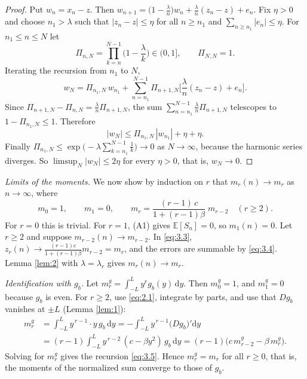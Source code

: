 \documentclass[aip,jmp,preprint,onecolumn,floatfix,superscriptaddress,nofootinbib,11pt]{revtex4-2}
\theoremstyle{plain}
\theoremstyle{remark}
\numberwithin{equation}{section}
\newcommand{\dd}{\mathrm{d}}
\newcommand{\E}{\mathbb{E}}
\begin{document}
\begin{proof} Put $w_n=x_n-z$. Then $w_{n+1}=\big(1-\tfrac\lambda n\big)w_n+\tfrac\lambda n(z_n-z)+e_n$. Fix $\eta>0$ and choose $n_1>\lambda$ such that $|z_n-z|\le\eta$ for all $n\ge n_1$ and $\sum_{n\ge n_1}|e_n|\le\eta$. For $n_1\le n\le N$ let
%
\begin{equation*}
\Pi_{n,N}=\prod_{k=n}^{N-1}\Big(1-\frac\lambda k\Big)\in(0,1],\qquad \Pi_{N,N}=1 .
\end{equation*}
%
Iterating the recursion from $n_1$ to $N$,
%
\begin{equation*}
w_N=\Pi_{n_1,N}\,w_{n_1}+\sum_{n=n_1}^{N-1}\Pi_{n+1,N}\Big[\frac\lambda n(z_n-z)+e_n\Big].
\end{equation*}
%
Since $\Pi_{n+1,N}-\Pi_{n,N}=\tfrac\lambda n \Pi_{n+1,N}$, the sum $\sum_{n=n_1}^{N-1}\tfrac\lambda n\Pi_{n+1,N}$ telescopes to $1-\Pi_{n_1,N}\le1$. Therefore
%
\begin{equation*}
|w_N|\le \Pi_{n_1,N}\,|w_{n_1}|+\eta+\eta .
\end{equation*}
%
Finally $\Pi_{n_1,N}\le\exp\big(-\lambda\sum_{k=n_1}^{N-1}\tfrac1k\big)\to0$ as $N\to\infty$, because the harmonic series diverges. So $\limsup_N|w_N|\le2\eta$ for every $\eta>0$, that is, $w_N\to0$. 
\end{proof}
 
\textit{Limits of the moments.} We now show by induction on $r$ that $m_r(n)\to m_r$ as $n\to\infty$, where
%
\begin{equation}
m_0=1,\qquad m_1=0,\qquad m_r=\frac{(r-1)\,c}{1+(r-1)\beta}\;m_{r-2}\quad(r\ge2).
\label{eq:3.5}
\end{equation}
%
For $r=0$ this is trivial. For $r=1$, (A1) gives $\E[S_n]=0$, so $m_1(n)=0$. Let $r\ge2$ and suppose $m_{r-2}(n)\to m_{r-2}$. In \eqref{eq:3.3}, $z_r(n)\to\tfrac{(r-1)c}{1+(r-1)\beta}m_{r-2}=m_r$, and the errors are summable by \eqref{eq:3.4}. Lemma \ref{lem:2} with $\lambda=\lambda_r$ gives $m_r(n)\to m_r$.
 
\textit{Identification with $g_b$.} Let $m_r^{g}=\int_{-L}^{L}y^{r}g_b(y)\,\dd y$. Then $m_0^{g}=1$, and $m_1^{g}=0$ because $g_b$ is even. For $r\ge2$, use \eqref{eq:2.1}, integrate by parts, and use that $Dg_b$ vanishes at $\pm L$ (Lemma \ref{lem:1}):
%
\begin{equation*}
\begin{aligned} m_r^{g}&=\int_{-L}^{L}y^{\,r-1}\cdot y\,g_b\,\dd y=-\int_{-L}^{L}y^{\,r-1}\big(Dg_b\big)'\dd y\\[4pt] &=(r-1)\int_{-L}^{L}y^{\,r-2}\,(c-\beta y^{2})\,g_b\,\dd y=(r-1)\big(c\,m_{r-2}^{g}-\beta\,m_r^{g}\big). \end{aligned}
\end{equation*}
%
Solving for $m_r^{g}$ gives the recursion \eqref{eq:3.5}. Hence $m_r^{g}=m_r$ for all $r\ge0$, that is, the moments of the normalized sum converge to those of $g_b$.
 
\end{document}
